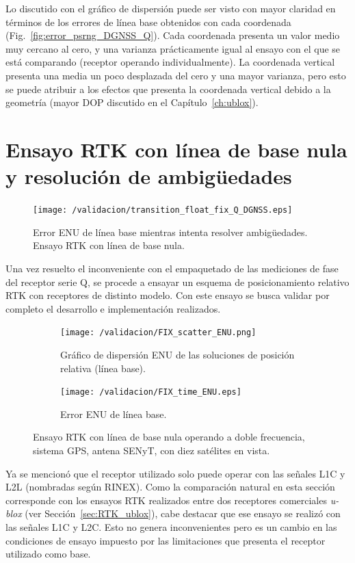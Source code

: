 \documentclass[a4paper,12pt,oneside,onecolumn,final,openright]{book}%
\begin{document}
	Lo discutido con el gráfico de dispersión puede ser visto con mayor claridad en términos de los errores de línea base obtenidos con cada coordenada (Fig.~\ref{fig:error_psrng_DGNSS_Q}). Cada coordenada presenta un valor medio muy cercano al cero, y una varianza prácticamente igual al ensayo con el que se está comparando (receptor operando individualmente). La coordenada vertical presenta una media un poco desplazada del cero y una mayor varianza, pero esto se puede atribuir a los efectos que presenta la coordenada vertical debido a la geometría (mayor DOP discutido en el Capítulo~\ref{ch:ublox}).
\section{Ensayo RTK con línea de base nula y resolución de ambigüedades}\label{sec:RTK_fix_Q}
\begin{figure}[t]
\centering
 	\texttt{[image: /validacion/transition\_float\_fix\_Q\_DGNSS.eps]}
 	\caption{Error ENU de línea base mientras intenta resolver ambigüedades. Ensayo RTK con línea de base nula.}
  	\label{fig:trans_float_fix_DGNSS_Q}
\end{figure}
	Una vez resuelto el inconveniente con el empaquetado de las mediciones de fase del receptor serie Q, se procede a ensayar un esquema de posicionamiento relativo RTK con receptores de distinto modelo. Con este ensayo se busca validar por completo el desarrollo e implementación realizados.
\begin{figure}
\begin{subfigure}{1\linewidth}
\centering
  	\texttt{[image: /validacion/FIX\_scatter\_ENU.png]}
  	\caption{Gráfico de dispersión ENU de las soluciones de posición relativa (línea base).}
    \label{fig:scatter_fix_DGNSS_Q}
\end{subfigure}

\begin{subfigure}{1\linewidth}
\centering
 	\texttt{[image: /validacion/FIX\_time\_ENU.eps]}
 	\caption{Error ENU de línea base.}
  	\label{fig:error_fix_DGNSS_Q}
\end{subfigure}
\caption{Ensayo RTK con línea de base nula operando a doble frecuencia, sistema GPS, antena SENyT, con diez satélites en vista.}
\label{fig:ensayoDGNSS_fix_Q}
\end{figure}
	
	Ya se mencionó que el receptor utilizado solo puede operar con las señales L1C y L2L (nombradas según RINEX). Como la comparación natural en esta sección corresponde con los ensayos RTK realizados entre dos receptores comerciales \textit{u-blox} (ver Sección~\ref{sec:RTK_ublox}), cabe destacar que ese ensayo se realizó con las señales L1C y L2C. Esto no genera inconvenientes pero es un cambio en las condiciones de ensayo impuesto por las limitaciones que presenta el receptor utilizado como base.
	
\end{document}
